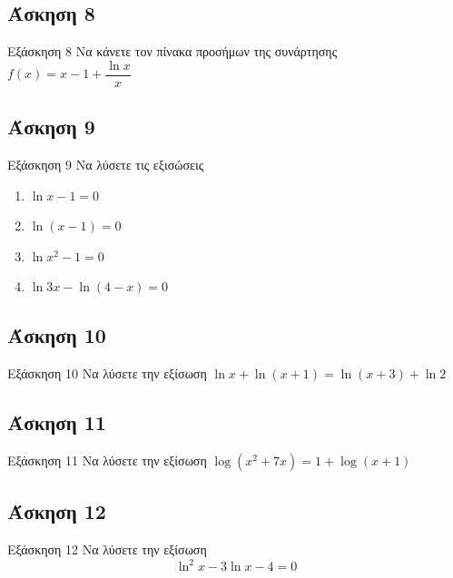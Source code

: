 \documentclass[greek]{beamer}
\begin{document}
\subsection{Άσκηση 8}
\begin{frame}[label=Άσκηση8,t]{Εξάσκηση 8}
  Να κάνετε τον πίνακα προσήμων της συνάρτησης $f(x)=x-1+\dfrac{\ln x}{x}$

\end{frame}

\subsection{Άσκηση 9}
\begin{frame}[label=Άσκηση9,t]{Εξάσκηση 9}
  Να λύσετε τις εξισώσεις
  \begin{enumerate}
    \item<1-> $\ln x-1=0$
    \item<2-> $\ln (x-1)=0$
    \item<3-> $\ln x^2-1=0$
    \item<4-> $\ln 3x-\ln(4-x)=0$
  \end{enumerate}

\end{frame}

\subsection{Άσκηση 10}
\begin{frame}[label=Άσκηση10,t]{Εξάσκηση 10}
  Να λύσετε την εξίσωση $\ln x+\ln (x+1)=\ln (x+3)+\ln 2$

\end{frame}

\subsection{Άσκηση 11}
\begin{frame}[label=Άσκηση11,t]{Εξάσκηση 11}
  Να λύσετε την εξίσωση $\log (x^2+7x)=1+\log (x+1)$

\end{frame}

\subsection{Άσκηση 12}
\begin{frame}[label=Άσκηση12,t]{Εξάσκηση 12}
  Να λύσετε την εξίσωση $$\ln^2x-3\ln x-4=0$$

\end{frame}
\end{document}

